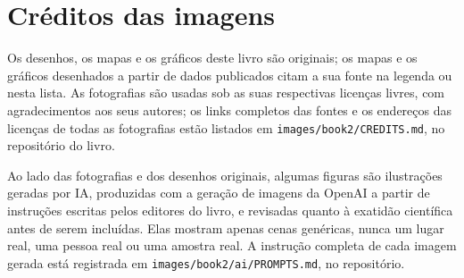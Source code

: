 \chapter*{Créditos das imagens}

Os desenhos, os mapas e os gráficos deste livro são originais; os mapas e
os gráficos desenhados a partir de dados publicados citam a sua fonte na
legenda ou nesta lista. As fotografias são usadas sob as suas respectivas
licenças livres, com agradecimentos aos seus autores; os links completos
das fontes e os endereços das licenças de todas as fotografias estão
listados em \texttt{images/book2/CREDITS.md}, no repositório do livro.

\bigskip
Ao lado das fotografias e dos desenhos originais, algumas figuras são
ilustrações geradas por IA, produzidas com a geração de imagens da OpenAI
a partir de instruções escritas pelos editores do livro, e revisadas
quanto à exatidão científica antes de serem incluídas. Elas mostram
apenas cenas genéricas, nunca um lugar real, uma pessoa real ou uma
amostra real. A instrução completa de cada imagem gerada está registrada
em \texttt{images/book2/ai/PROMPTS.md}, no repositório.

